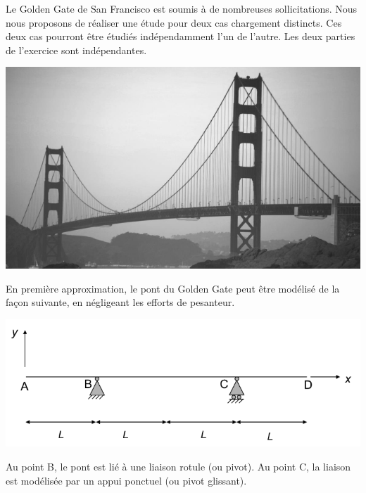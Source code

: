 \documentclass[lecture.tex]{subfiles}
\begin{document}

Le Golden Gate de San Francisco est soumis à de nombreuses sollicitations. Nous nous proposons de réaliser une étude pour deux cas chargement distincts. Ces deux cas pourront être étudiés indépendamment l’un de l’autre. Les deux parties de l’exercice sont indépendantes.

\begin{center}
  \includegraphics[scale=0.4]{figA0025.png}
\end{center}

En première approximation, le pont du Golden Gate peut être modélisé de la façon suivante, en négligeant les efforts de pesanteur.

\begin{center}
  \includegraphics[scale=0.4]{figB0025.png}
\end{center}

Au point B, le pont est lié à une liaison rotule (ou pivot). Au point C, la liaison est modélisée par un appui ponctuel (ou pivot glissant).

\bigskip
\end{document}
